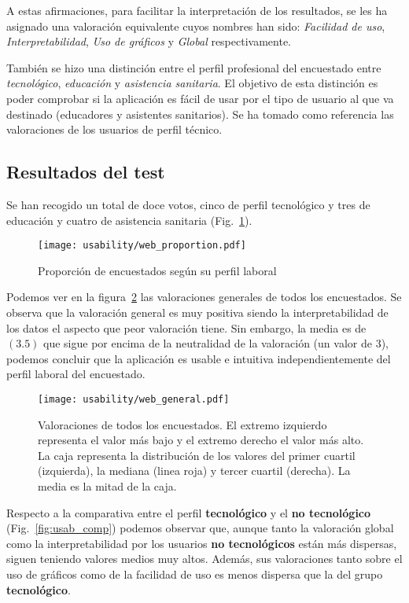 A estas afirmaciones, para facilitar la interpretación de los resultados, se les ha asignado una valoración equivalente cuyos nombres han sido: \textit{Facilidad de uso}, \textit{Interpretabilidad}, \textit{Uso de gráficos} y \textit{Global} respectivamente.

También se hizo una distinción entre el perfil profesional del encuestado entre \textit{tecnológico}, \textit{educación} y \textit{asistencia sanitaria}. El objetivo de esta distinción es poder comprobar si la aplicación es fácil de usar por el tipo de usuario al que va destinado (educadores y asistentes sanitarios). Se ha tomado como referencia las valoraciones de los usuarios de perfil técnico. 

\subsection{Resultados del test}
Se han recogido un total de doce votos, cinco de perfil tecnológico y tres de educación y cuatro de asistencia sanitaria (Fig.~\ref{fig:usab_prop}).

\begin{figure}
	\centering
	\texttt{[image: usability/web\_proportion.pdf]}
	\caption{Proporción de encuestados según su perfil laboral}
	\label{fig:usab_prop}
\end{figure}

Podemos ver en la figura~\ref{fig:usab_global} las valoraciones generales de todos los encuestados. Se observa que la valoración general es muy positiva siendo la interpretabilidad de los datos el aspecto que peor valoración tiene. Sin embargo, la media es de $(3.5)$ que sigue por encima de la neutralidad de la valoración (un valor de $3$), podemos concluir que la aplicación es usable e intuitiva independientemente del perfil laboral del encuestado.

\begin{figure}
	\centering
	\texttt{[image: usability/web\_general.pdf]}
	\caption[Valoraciones de todos los encuestados.]{Valoraciones de todos los encuestados. El extremo izquierdo representa el valor más bajo y el extremo derecho el valor más alto. La caja representa la distribución de los valores del primer cuartil (izquierda), la mediana (linea roja) y tercer cuartil (derecha). La media es la mitad de la caja.}
	\label{fig:usab_global}
\end{figure}

Respecto a la comparativa entre el perfil \textbf{tecnológico} y el \textbf{no tecnológico} (Fig.~\ref{fig:usab_comp}) podemos observar que, aunque tanto la valoración global como la interpretabilidad por los usuarios \textbf{no tecnológicos} están más dispersas, siguen teniendo valores medios muy altos. Además, sus valoraciones tanto sobre el uso de gráficos como de la facilidad de uso es menos dispersa que la del grupo \textbf{tecnológico}.

